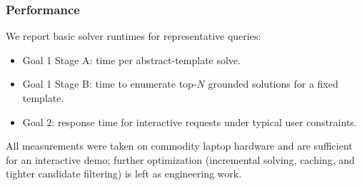 \subsubsection{Performance}
We report basic solver runtimes for representative queries:
\begin{itemize}
    \item Goal 1 Stage A: time per abstract-template solve.
    \item Goal 1 Stage B: time to enumerate top-$N$ grounded solutions for a fixed template.
    \item Goal 2: response time for interactive requests under typical user constraints.
\end{itemize}
All measurements were taken on commodity laptop hardware and are sufficient for an interactive demo; further optimization (incremental solving, caching, and tighter candidate filtering) is left as engineering work.

